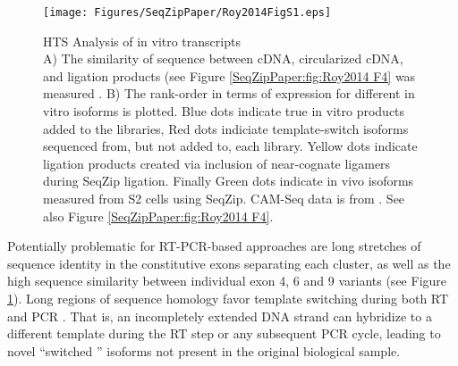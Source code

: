 		\begin{figure} %
			\centering 
			\texttt{[image: Figures/SeqZipPaper/Roy2014FigS1.eps]}
			\caption[HTS Analysis of \dscam{} in vitro transcripts]
			{
				HTS Analysis of \dscam{} in vitro transcripts\\[0.25cm]
				 A) The similarity of sequence between cDNA, circularized cDNA, and ligation products (see Figure \ref{SeqZipPaper:fig:Roy2014 F4} was measured \citep{Waterhouse2009,Notredame2000}. B) The rank-order in terms of expression for different in vitro \dscam{} isoforms is plotted. Blue dots indicate true in vitro products added to the libraries, Red dots indiciate template-switch isoforms sequenced from, but not added to, each library. Yellow dots indicate ligation products created via inclusion of near-cognate ligamers during SeqZip ligation. Finally Green dots indicate in vivo isoforms measured from S2 cells using SeqZip. CAM-Seq data is from \citep{Sun2013}. See also Figure \ref{SeqZipPaper:fig:Roy2014 F4}.
				}
			\label{SeqZipPaper:fig:Roy2014 S1}
			\end{figure}

		Potentially problematic for RT-PCR-based approaches are long stretches of sequence identity in the constitutive exons separating each cluster, as well as the high sequence similarity between individual exon 4, 6 and 9 variants (see Figure \ref{SeqZipPaper:fig:Roy2014 S1}). Long regions of sequence homology favor template switching during both RT and PCR \citep{Houseley2010a,Judo1998}. That is, an incompletely extended DNA strand can hybridize to a different template during the RT step or any subsequent PCR cycle, leading to novel ``switched '' isoforms not present in the original biological sample.

